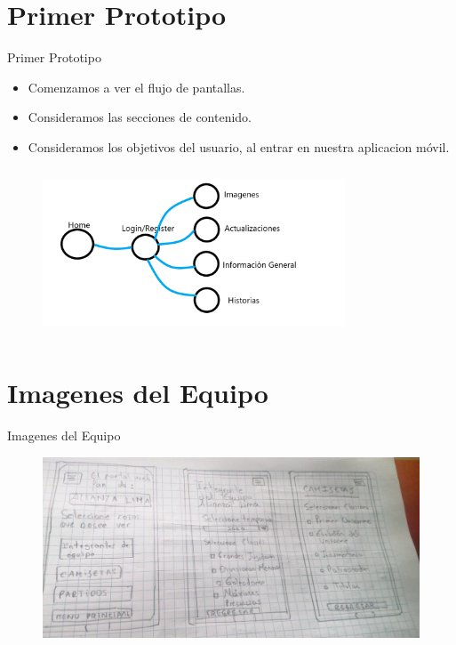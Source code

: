 \documentclass[11pt]{beamer}
\begin{document}
\section{Primer Prototipo}
\begin{frame}{Primer Prototipo}
\begin{itemize}
    \item Comenzamos a ver el flujo de pantallas.
    \item Consideramos las secciones de contenido.
    \item Consideramos los objetivos del usuario, al entrar en nuestra aplicacion móvil. 
\end{itemize}
\begin{figure}[t]
\includegraphics[width=9cm, height=5cm]{flujo.png}
\centering
\end{figure}
\end{frame}
\section{Imagenes del Equipo}
\begin{frame}{Imagenes del Equipo}

\begin{figure}
\includegraphics[width=\linewidth]{interfaces1.jpeg}
\centering
\end{figure}
\end{frame}
\end{document}
